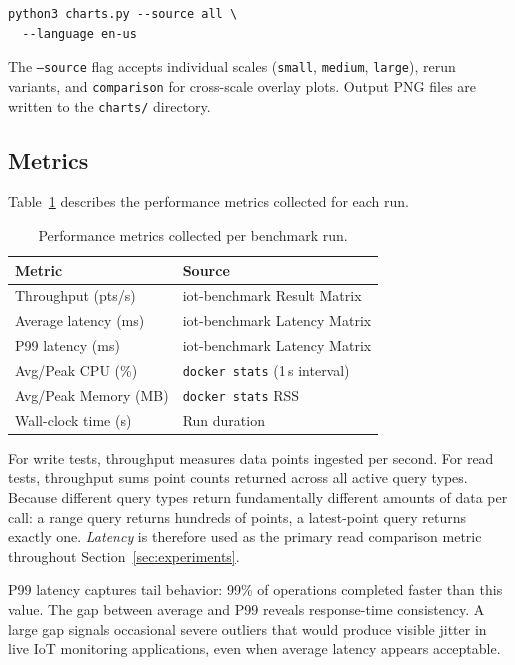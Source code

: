 \begin{verbatim}
python3 charts.py --source all \
  --language en-us
\end{verbatim}

The \texttt{--source} flag accepts individual scales (\texttt{small},
\texttt{medium}, \texttt{large}), rerun variants, and \texttt{comparison}
for cross-scale overlay plots. Output PNG files are written to the
\texttt{charts/} directory.

\subsection{Metrics}
\label{sec:metrics}

Table~\ref{tab:metrics} describes the performance metrics collected for each run.

\begin{table}[t]
  \centering
  \caption{Performance metrics collected per benchmark run.}
  \label{tab:metrics}
  \begin{tabular}{ll}
    \hline
    \textbf{Metric} & \textbf{Source} \\
    \hline
    Throughput (pts/s)    & iot-benchmark Result Matrix \\
    Average latency (ms)  & iot-benchmark Latency Matrix \\
    P99 latency (ms)      & iot-benchmark Latency Matrix \\
    Avg/Peak CPU (\%)     & \texttt{docker stats} (1\,s interval) \\
    Avg/Peak Memory (MB)  & \texttt{docker stats} RSS \\
    Wall-clock time (s)   & Run duration \\
    \hline
  \end{tabular}
\end{table}

For write tests, throughput measures data points ingested per second. For read tests,
throughput sums point counts returned across all active query types. Because different query
types return fundamentally different amounts of data per call: a range query returns
hundreds of points, a latest-point query returns exactly one. \textit{Latency} is therefore
used as the primary read comparison metric throughout Section~\ref{sec:experiments}.

P99 latency captures tail behavior: 99\% of operations completed faster than this value.
The gap between average and P99 reveals response-time consistency. A large gap signals
occasional severe outliers that would produce visible jitter in live IoT monitoring applications,
even when average latency appears acceptable.

